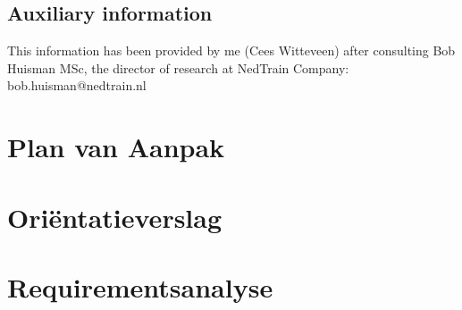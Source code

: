 \begin{appendices}
\subsection*{Auxiliary information}

This information has been provided by me (Cees Witteveen) after consulting Bob Huisman MSc, the director of research at NedTrain Company: bob.huisman@nedtrain.nl
\newpage

\section{Plan van Aanpak} \label{app:B}
\newpage


\section{Ori\"entatieverslag} \label{app:C}
\newpage


\section{Requirementsanalyse} \label{app:D}
\newpage


\end{appendices}
